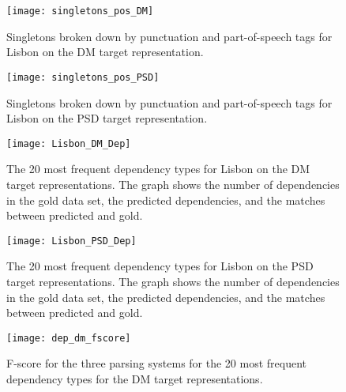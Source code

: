 \begin{figure}[h]
    \centering
    \begin{minipage}{0.8\textwidth}
        \centering
        \texttt{[image: singletons\_pos\_DM]}
    \end{minipage}\hfill
    \caption{Singletons broken down by punctuation and part-of-speech tags for Lisbon on the DM target representation.}
    \label{fig:singletons_pos_DM}
\end{figure}

\begin{figure}[h]
    \centering
    \begin{minipage}{0.8\textwidth}
        \centering
        \texttt{[image: singletons\_pos\_PSD]}
    \end{minipage}
    \caption{Singletons broken down by punctuation and part-of-speech tags for Lisbon on the PSD target representation.}
    \label{fig:singletons_pos_PSD}
\end{figure}

\begin{figure}[h]
    \centering
    \begin{minipage}{0.8\textwidth}
        \centering
        \texttt{[image: Lisbon\_DM\_Dep]}
    \end{minipage}\hfill
    \caption{The 20 most frequent dependency types for Lisbon on the DM target representations. The graph shows the number of dependencies in the gold data set, the predicted dependencies, and the matches between predicted and gold.}
    \label{fig:lisbon_dep_DM}
\end{figure}

\begin{figure}[h]
    \centering
    \begin{minipage}{0.8\textwidth}
        \centering
        \texttt{[image: Lisbon\_PSD\_Dep]}
    \end{minipage}
    \caption{The 20 most frequent dependency types for Lisbon on the PSD target representations. The graph shows the number of dependencies in the gold data set, the predicted dependencies, and the matches between predicted and gold.}
    \label{fig:lisbon_dep_PSD}
\end{figure}

\begin{figure}[h]
    \centering
    \begin{minipage}{0.8\textwidth}
        \centering
        \texttt{[image: dep\_dm\_fscore]}
    \end{minipage}\hfill
    \caption{F-score for the three parsing systems for the 20 most frequent dependency types for the DM target representations.}
    \label{fig:dep_fscore_DM}
\end{figure}

